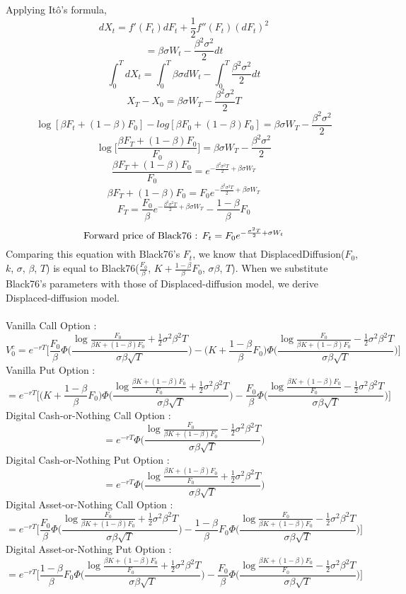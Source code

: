 \documentclass{article}
\def\mystyle{decsci}
\begin{document}
Applying It\^{o}'s formula,
$$
dX_t = f'(F_t)dF_t + \frac{1}{2}f''(F_t)(dF_t)^{2}
$$$$
= \beta\sigma W_t - \frac{\beta^{2}\sigma^{2}}{2}dt
$$$$
\int_{0}^{T}dX_t = \int_{0}^{T}\beta \sigma dW_t - \int_{0}^{T}\frac{\beta^{2}\sigma^{2}}{2}dt
$$$$
X_T-X_0 = \beta\sigma W_T - \frac{\beta^{2}\sigma^{2}}{2}T
$$$$
\log[\beta F_t+(1-\beta)F_0] - log[\beta F_0+(1-\beta)F_0] = \beta\sigma W_T - \frac{\beta^{2}\sigma^{2}}{2}
$$$$
\log\bigg[\frac{\beta F_T+(1-\beta)F_0}{F_0}\bigg] = \beta\sigma W_T - \frac{\beta^{2}\sigma^{2}}{2}
$$$$
\frac{\beta F_T+(1-\beta)F_0}{F_0} = e^{-\frac{\beta^{2}\sigma^{2}T}{2} + \beta\sigma W_T}
$$$$
\beta F_T+(1-\beta)F_0 = F_0e^{-\frac{\beta^{2}\sigma^{2}T}{2} + \beta\sigma W_T}
$$$$
F_T = \frac{F_0}{\beta}e^{-\frac{\beta^{2}\sigma^{2}T}{2} + \beta\sigma W_T}-\frac{1-\beta}{\beta}F_0
$$
$$
\textnormal{Forward price of Black76 : } F_t = F_0e^{-\frac{\sigma^{2}T}{2} + \sigma W_t}
$$
Comparing this equation with Black76's $F_t$, we know that DisplacedDiffusion($F_0$, $k$, $\sigma$, $\beta$, $T$) is equal to Black76($\frac{F_0}{\beta}$, $K+\frac{1-\beta}{\beta}F_0$, $\sigma\beta$, $T$). When we substitute Black76's parameters with those of Displaced-diffusion model, we derive Displaced-diffusion model.
\\
\\
Vanilla Call Option : 
$$
V_0^{c} = e^{-rT}\Bigg[\frac{F_0}{\beta} \Phi\Bigg(\frac{\log{\frac{F_0}{\beta K +(1-\beta)F_0}}+\frac{1}{2}\sigma^{2}\beta^{2}T}{\sigma\beta\sqrt{T}}\Bigg) - \Bigg(K + \frac{1-\beta}{\beta}F_0\Bigg)\Phi\Bigg(\frac{\log{\frac{F_0}{\beta K +(1-\beta)F_0}}-\frac{1}{2}\sigma^{2}\beta^{2}T}{\sigma\beta\sqrt{T}}\Bigg)\Bigg]
$$
Vanilla Put Option : 
$$
= e^{-rT}\Bigg[\Bigg(K + \frac{1-\beta}{\beta}F_0\Bigg)\Phi\Bigg(\frac{\log{\frac{\beta K +(1-\beta)F_0}{F_0}}+\frac{1}{2}\sigma^{2}\beta^{2}T}{\sigma\beta\sqrt{T}}\Bigg) - \frac{F_0}{\beta}\Phi\Bigg(\frac{\log{\frac{\beta K +(1-\beta)F_0}{F_0}}-\frac{1}{2}\sigma^{2}\beta^{2}T}{\sigma\beta\sqrt{T}}\Bigg)\Bigg]
$$
Digital Cash-or-Nothing Call Option :
$$
= e^{-rT}\Phi\Bigg(\frac{\log{\frac{F_0}{\beta K +(1-\beta)F_0}}-\frac{1}{2}\sigma^{2}\beta^{2}T}{\sigma\beta\sqrt{T}}\Bigg)
$$
Digital Cash-or-Nothing Put Option :
$$
= e^{-rT}\Phi\Bigg(\frac{\log{\frac{\beta K +(1-\beta)F_0}{F_0}}+\frac{1}{2}\sigma^{2}\beta^{2}T}{\sigma\beta\sqrt{T}}\Bigg)
$$
Digital Asset-or-Nothing Call Option :
$$
= e^{-rT}\Bigg[\frac{F_0}{\beta}\Phi\Bigg(\frac{\log{\frac{F_0}{\beta K +(1-\beta)F_0}}+\frac{1}{2}\sigma^{2}\beta^{2}T}{\sigma\beta\sqrt{T}}\Bigg) - \frac{1-\beta}{\beta}F_0\Phi\Bigg(\frac{\log{\frac{F_0}{\beta K +(1-\beta)F_0}}-\frac{1}{2}\sigma^{2}\beta^{2}T}{\sigma\beta\sqrt{T}}\Bigg)\Bigg]
$$
Digital Asset-or-Nothing Put Option :
$$
= e^{-rT}\Bigg[\frac{1-\beta}{\beta}F_0\Phi\Bigg(\frac{\log{\frac{\beta K +(1-\beta)F_0}{F_0}}+\frac{1}{2}\sigma^{2}\beta^{2}T}{\sigma\beta\sqrt{T}}\Bigg) - \frac{F_0}{\beta}\Phi\Bigg(\frac{\log{\frac{\beta K +(1-\beta)F_0}{F_0}}-\frac{1}{2}\sigma^{2}\beta^{2}T}{\sigma\beta\sqrt{T}}\Bigg)\Bigg]
$$

\end{document}
